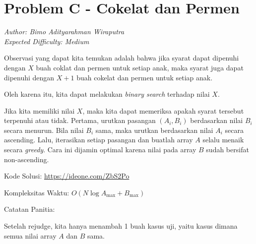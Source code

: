 \section*{Problem C - Cokelat dan Permen}
\textit{Author: Bimo Adityarahman Wiraputra}
\\
\textit{Expected Difficulty: Medium}

Observasi yang dapat kita temukan adalah bahwa jika syarat dapat dipenuhi dengan $X$ buah coklat dan permen untuk setiap anak, maka syarat juga dapat dipenuhi dengan $X+1$ buah cokelat dan permen untuk setiap anak.

Oleh karena itu, kita dapat melakukan \textit{binary search} terhadap nilai $X$.

Jika kita memiliki nilai $X$, maka kita dapat memeriksa apakah syarat tersebut terpenuhi atau tidak. Pertama, urutkan pasangan $(A_i, B_i)$ berdasarkan nilai $B_i$ secara menurun. Bila nilai $B_i$ sama, maka urutkan berdasarkan nilai $A_i$ secara ascending. Lalu, iterasikan setiap pasangan dan buatlah array $A$ selalu menaik secara \textit{greedy}. Cara ini dijamin optimal karena nilai pada array $B$ sudah bersifat non-ascending.

Kode Solusi: \url{https://ideone.com/ZbS2Po}

Kompleksitas Waktu: $O(N\log{A_{\max} + B_{\max}})$

Catatan Panitia: 

Setelah rejudge, kita hanya menambah 1 buah kasus uji, yaitu kasus dimana semua nilai array $A$ dan $B$ sama.